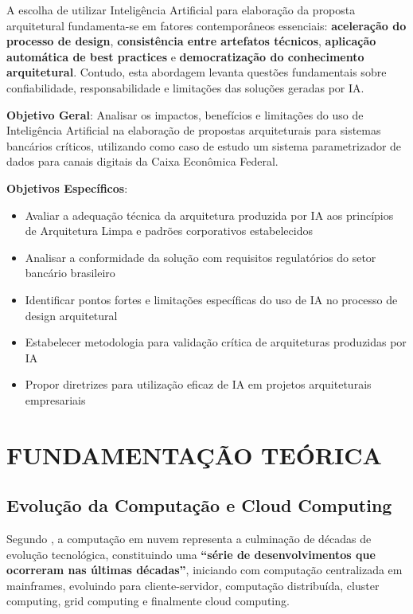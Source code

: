 A escolha de utilizar Inteligência Artificial para elaboração da proposta arquitetural fundamenta-se em fatores contemporâneos essenciais: \textbf{aceleração do processo de design}, \textbf{consistência entre artefatos técnicos}, \textbf{aplicação automática de best practices} e \textbf{democratização do conhecimento arquitetural}. Contudo, esta abordagem levanta questões fundamentais sobre confiabilidade, responsabilidade e limitações das soluções geradas por IA.

\textbf{Objetivo Geral}: Analisar os impactos, benefícios e limitações do uso de Inteligência Artificial na elaboração de propostas arquiteturais para sistemas bancários críticos, utilizando como caso de estudo um sistema parametrizador de dados para canais digitais da Caixa Econômica Federal.

\textbf{Objetivos Específicos}:

\begin{itemize}
\item Avaliar a adequação técnica da arquitetura produzida por IA aos princípios de Arquitetura Limpa e padrões corporativos estabelecidos
\item Analisar a conformidade da solução com requisitos regulatórios do setor bancário brasileiro
\item Identificar pontos fortes e limitações específicas do uso de IA no processo de design arquitetural
\item Estabelecer metodologia para validação crítica de arquiteturas produzidas por IA
\item Propor diretrizes para utilização eficaz de IA em projetos arquiteturais empresariais
\end{itemize}

\chapter{FUNDAMENTAÇÃO TEÓRICA}

\section{Evolução da Computação e Cloud Computing}

Segundo , a computação em nuvem representa a culminação de décadas de evolução tecnológica, constituindo uma \textbf{``série de desenvolvimentos que ocorreram nas últimas décadas''}, iniciando com computação centralizada em mainframes, evoluindo para cliente-servidor, computação distribuída, cluster computing, grid computing e finalmente cloud computing.

